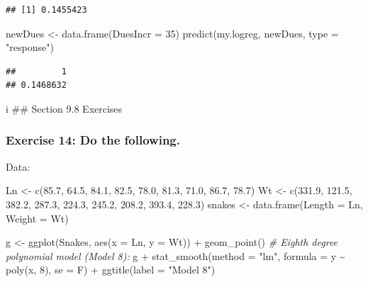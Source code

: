 \documentclass[
]{article}
\newenvironment{Shaded}{\begin{snugshade}}{\end{snugshade}}
\newcommand{\AttributeTok}[1]{\textcolor[rgb]{0.77,0.63,0.00}{#1}}
\newcommand{\CommentTok}[1]{\textcolor[rgb]{0.56,0.35,0.01}{\textit{#1}}}
\newcommand{\DecValTok}[1]{\textcolor[rgb]{0.00,0.00,0.81}{#1}}
\newcommand{\FloatTok}[1]{\textcolor[rgb]{0.00,0.00,0.81}{#1}}
\newcommand{\FunctionTok}[1]{\textcolor[rgb]{0.00,0.00,0.00}{#1}}
\newcommand{\NormalTok}[1]{#1}
\newcommand{\OtherTok}[1]{\textcolor[rgb]{0.56,0.35,0.01}{#1}}
\newcommand{\SpecialCharTok}[1]{\textcolor[rgb]{0.00,0.00,0.00}{#1}}
\newcommand{\StringTok}[1]{\textcolor[rgb]{0.31,0.60,0.02}{#1}}
\begin{document}
\begin{verbatim}
## [1] 0.1455423
\end{verbatim}

\begin{Shaded}
\begin{Highlighting}[]
\NormalTok{newDues }\OtherTok{\textless{}{-}} \FunctionTok{data.frame}\NormalTok{(}\AttributeTok{DuesIncr =} \DecValTok{35}\NormalTok{)}
\FunctionTok{predict}\NormalTok{(my.logreg, newDues, }\AttributeTok{type =} \StringTok{"response"}\NormalTok{)}
\end{Highlighting}
\end{Shaded}

\begin{verbatim}
##         1 
## 0.1468632
\end{verbatim}

\newpage

i \#\# Section 9.8 Exercises

\hypertarget{exercise-14-do-the-following.}{%
\subsubsection{Exercise 14: Do the
following.}\label{exercise-14-do-the-following.}}

\hfill\break
Data:

\begin{Shaded}
\begin{Highlighting}[]
\NormalTok{Ln }\OtherTok{\textless{}{-}} \FunctionTok{c}\NormalTok{(}\FloatTok{85.7}\NormalTok{, }\FloatTok{64.5}\NormalTok{, }\FloatTok{84.1}\NormalTok{, }\FloatTok{82.5}\NormalTok{, }\FloatTok{78.0}\NormalTok{, }\FloatTok{81.3}\NormalTok{, }\FloatTok{71.0}\NormalTok{, }\FloatTok{86.7}\NormalTok{, }\FloatTok{78.7}\NormalTok{)}
\NormalTok{Wt }\OtherTok{\textless{}{-}}
  \FunctionTok{c}\NormalTok{(}\FloatTok{331.9}\NormalTok{, }\FloatTok{121.5}\NormalTok{, }\FloatTok{382.2}\NormalTok{, }\FloatTok{287.3}\NormalTok{, }\FloatTok{224.3}\NormalTok{, }\FloatTok{245.2}\NormalTok{, }\FloatTok{208.2}\NormalTok{, }\FloatTok{393.4}\NormalTok{, }\FloatTok{228.3}\NormalTok{)}
\NormalTok{snakes }\OtherTok{\textless{}{-}} \FunctionTok{data.frame}\NormalTok{(}\AttributeTok{Length =}\NormalTok{ Ln, }\AttributeTok{Weight =}\NormalTok{ Wt)}

\NormalTok{g }\OtherTok{\textless{}{-}} \FunctionTok{ggplot}\NormalTok{(Snakes, }\FunctionTok{aes}\NormalTok{(}\AttributeTok{x =}\NormalTok{ Ln, }\AttributeTok{y =}\NormalTok{ Wt)) }\SpecialCharTok{+} \FunctionTok{geom\_point}\NormalTok{()}
\CommentTok{\# Eighth degree polynomial model (Model 8):}
\NormalTok{g }\SpecialCharTok{+} \FunctionTok{stat\_smooth}\NormalTok{(}\AttributeTok{method =} \StringTok{"lm"}\NormalTok{,}
                \AttributeTok{formula =}\NormalTok{ y }\SpecialCharTok{\textasciitilde{}} \FunctionTok{poly}\NormalTok{(x, }\DecValTok{8}\NormalTok{),}
                \AttributeTok{se =}\NormalTok{ F) }\SpecialCharTok{+}
  \FunctionTok{ggtitle}\NormalTok{(}\AttributeTok{label =} \StringTok{"Model 8"}\NormalTok{)}
\end{Highlighting}
\end{Shaded}
\end{document}
